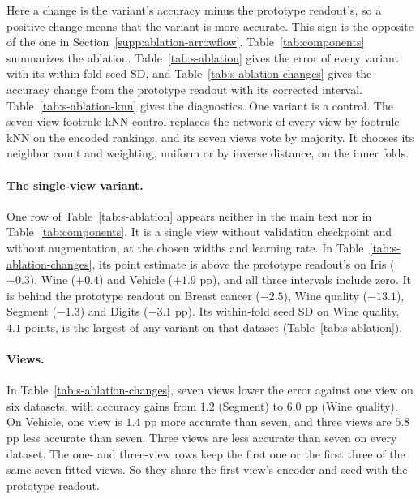 Here a change is the variant's accuracy minus the prototype readout's, so a positive change means that the variant is more accurate. This sign is the opposite of the one in Section~\ref{supp:ablation-arrowflow}. Table~\ref{tab:components} summarizes the ablation. Table~\ref{tab:s-ablation} gives the error of every variant with its within-fold seed SD, and Table~\ref{tab:s-ablation-changes} gives the accuracy change from the prototype readout with its corrected interval. Table~\ref{tab:s-ablation-knn} gives the diagnostics. One variant is a control. The seven-view footrule kNN control replaces the network of every view by footrule kNN on the encoded rankings, and its seven views vote by majority. It chooses its neighbor count and weighting, uniform or by inverse distance, on the inner folds.






\paragraph{The single-view variant.} One row of Table~\ref{tab:s-ablation} appears neither in the main text nor in Table~\ref{tab:components}. It is a single view without validation checkpoint and without augmentation, at the chosen widths and learning rate. In Table~\ref{tab:s-ablation-changes}, its point estimate is above the prototype readout's on Iris ($+0.3$), Wine ($+0.4$) and Vehicle ($+1.9$ pp), and all three intervals include zero. It is behind the prototype readout on Breast cancer ($-2.5$), Wine quality ($-13.1$), Segment ($-1.3$) and Digits ($-3.1$ pp). Its within-fold seed SD on Wine quality, $4.1$ points, is the largest of any variant on that dataset (Table~\ref{tab:s-ablation}).

\paragraph{Views.} In Table~\ref{tab:s-ablation-changes}, seven views lower the error against one view on six datasets, with accuracy gains from $1.2$ (Segment) to $6.0$ pp (Wine quality). On Vehicle, one view is $1.4$ pp more accurate than seven, and three views are $5.8$ pp less accurate than seven. Three views are less accurate than seven on every dataset. The one- and three-view rows keep the first one or the first three of the same seven fitted views. So they share the first view's encoder and seed with the prototype readout.

